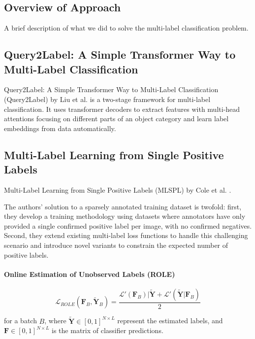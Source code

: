 \documentclass[lettersize,journal]{IEEEtran}
\begin{document}
\subsection{Overview of Approach}
A brief description of what we did to solve the multi-label classification problem. 



\subsection{Query2Label: A Simple Transformer Way to Multi-Label Classification}
\label{sec:q2l_method}
Query2Label: A Simple Transformer Way to Multi-Label Classification (Query2Label) by Liu et al. \cite{Query2Label} is a two-stage framework for multi-label classification. It uses transformer decoders to extract features with multi-head attentions focusing on different parts of an object category and learn label embeddings from data automatically.

\subsection{Multi-Label Learning from Single Positive Labels}
Multi-Label Learning from Single Positive Labels (MLSPL) by Cole et al. \cite{mlsp}.

The authors' solution to a sparsely annotated training dataset is twofold: first, they develop a training methodology using datasets where annotators have only provided a single confirmed positive label per image, with no confirmed negatives. Second, they extend existing multi-label loss functions to handle this challenging scenario and introduce novel variants to constrain the expected number of positive labels.

\paragraph{Online Estimation of Unobserved Labels (ROLE)}

\begin{equation}
    \mathcal{L}_{ROLE}(\mathbf{F}_B, \mathbf{\tilde{Y}}_B) = \frac{\mathcal{L}'(\mathbf{F}_B)|\mathbf{\tilde{Y}}+\mathcal{L}'(\mathbf{\tilde{Y}}|\mathbf{F}_B)}{2}
\end{equation}

for a batch $B$, where $\mathbf{\tilde{Y}}\in[0,1]^{N\times L}$ represent the estimated labels, and $\mathbf{F}\in[0,1]^{N\times L}$ is the matrix of classifier predictions.
\end{document}
